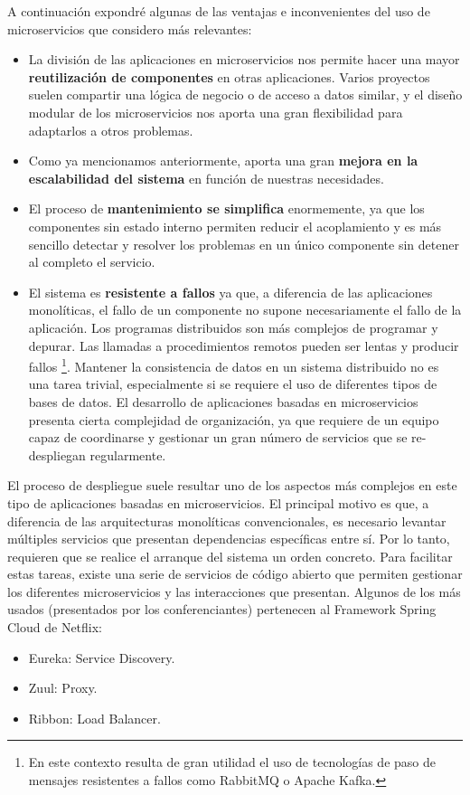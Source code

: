 A continuación expondré algunas de las ventajas e inconvenientes del uso de microservicios que considero más relevantes:
\begin{itemize}
\item La división de las aplicaciones en microservicios nos permite hacer una mayor \textbf{reutilización de componentes} en otras aplicaciones. Varios proyectos suelen compartir una lógica de negocio o de acceso a datos similar, y el diseño modular de los microservicios nos aporta una gran flexibilidad para adaptarlos a otros problemas.
\item Como ya mencionamos anteriormente, aporta una gran \textbf{mejora en la escalabilidad del sistema} en función de nuestras necesidades.
\item El proceso de \textbf{mantenimiento se simplifica} enormemente, ya que los componentes sin estado interno permiten reducir el acoplamiento y es más sencillo detectar y resolver los problemas en un único componente sin detener al completo el servicio.
\item El sistema es \textbf{resistente a fallos} ya que, a diferencia de las aplicaciones monolíticas, el fallo de un componente no supone necesariamente el fallo de la aplicación.
\con Los programas distribuidos son más complejos de programar y depurar. Las llamadas a procedimientos remotos pueden ser lentas y producir fallos \footnote{En este contexto resulta de gran utilidad el uso de tecnologías de paso de mensajes resistentes a fallos como RabbitMQ o Apache Kafka.}.
\con Mantener la consistencia de datos en un sistema distribuido no es una tarea trivial, especialmente si se requiere el uso de diferentes tipos de bases de datos.
\con El desarrollo de aplicaciones basadas en microservicios presenta cierta complejidad de organización, ya que requiere de un equipo capaz de coordinarse y gestionar un gran número de servicios que se re-despliegan regularmente.
\end{itemize}

El proceso de despliegue suele resultar uno de los aspectos más complejos en este tipo de aplicaciones basadas en microservicios. El principal motivo es que, a diferencia de las arquitecturas monolíticas convencionales, es necesario levantar múltiples servicios que presentan dependencias específicas entre sí. Por lo tanto, requieren que se realice el arranque del sistema un orden concreto. Para facilitar estas tareas, existe una serie de servicios de código abierto que permiten gestionar los diferentes microservicios y las interacciones que presentan. Algunos de los más usados (presentados por los conferenciantes) pertenecen al Framework Spring Cloud de Netflix:
\begin{itemize}
\item Eureka: Service Discovery.
\item Zuul: Proxy.
\item Ribbon: Load Balancer.
\end{itemize}

